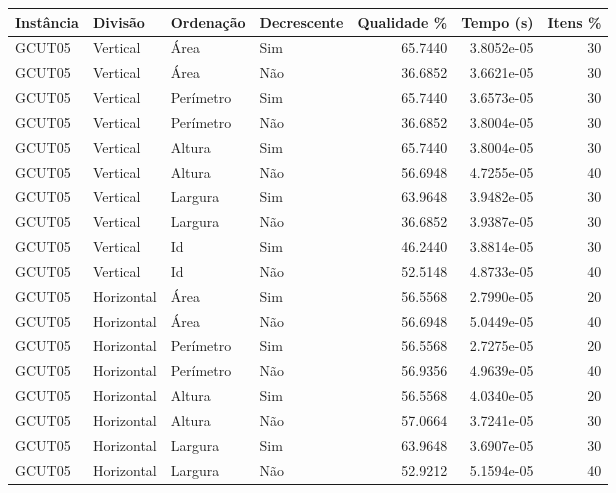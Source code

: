 \begin{tabular}{llllrrr}
    \hline
    Instância & Divisão     & Ordenação & Decrescente & Qualidade \% & Tempo (s)  & Itens \% \\
    \hline
    GCUT05    & Vertical    & Área      & Sim         & 65.7440      & 3.8052e-05 & 30       \\
    GCUT05    & Vertical    & Área      & Não         & 36.6852      & 3.6621e-05 & 30       \\
    GCUT05    & Vertical    & Perímetro & Sim         & 65.7440      & 3.6573e-05 & 30       \\
    GCUT05    & Vertical    & Perímetro & Não         & 36.6852      & 3.8004e-05 & 30       \\
    GCUT05    & Vertical    & Altura    & Sim         & 65.7440      & 3.8004e-05 & 30       \\
    GCUT05    & Vertical    & Altura    & Não         & 56.6948      & 4.7255e-05 & 40       \\
    GCUT05    & Vertical    & Largura   & Sim         & 63.9648      & 3.9482e-05 & 30       \\
    GCUT05    & Vertical    & Largura   & Não         & 36.6852      & 3.9387e-05 & 30       \\
    GCUT05    & Vertical    & Id        & Sim         & 46.2440      & 3.8814e-05 & 30       \\
    GCUT05    & Vertical    & Id        & Não         & 52.5148      & 4.8733e-05 & 40       \\
    GCUT05    & Horizontal  & Área      & Sim         & 56.5568      & 2.7990e-05 & 20       \\
    GCUT05    & Horizontal  & Área      & Não         & 56.6948      & 5.0449e-05 & 40       \\
    GCUT05    & Horizontal  & Perímetro & Sim         & 56.5568      & 2.7275e-05 & 20       \\
    GCUT05    & Horizontal  & Perímetro & Não         & 56.9356      & 4.9639e-05 & 40       \\
    GCUT05    & Horizontal  & Altura    & Sim         & 56.5568      & 4.0340e-05 & 20       \\
    GCUT05    & Horizontal  & Altura    & Não         & 57.0664      & 3.7241e-05 & 30       \\
    GCUT05    & Horizontal  & Largura   & Sim         & 63.9648      & 3.6907e-05 & 30       \\
    GCUT05    & Horizontal  & Largura   & Não         & 52.9212      & 5.1594e-05 & 40       \\

\end{tabular}
